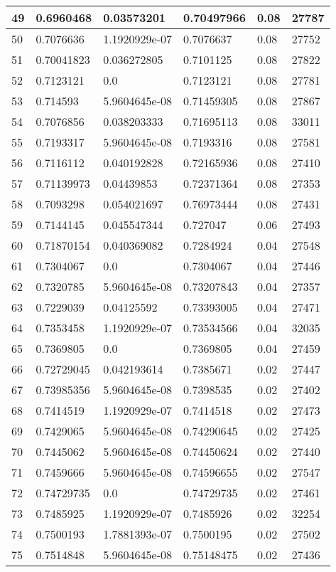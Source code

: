 \begin{longtable}{|l|l|l|l|l|l|}
49 & 0.6960468 & 0.03573201 & 0.70497966 & 0.08 & 27787 \\ \hline 
50 & 0.7076636 & 1.1920929e-07 & 0.7076637 & 0.08 & 27752 \\ \hline 
51 & 0.70041823 & 0.036272805 & 0.7101125 & 0.08 & 27822 \\ \hline 
52 & 0.7123121 & 0.0 & 0.7123121 & 0.08 & 27781 \\ \hline 
53 & 0.714593 & 5.9604645e-08 & 0.71459305 & 0.08 & 27867 \\ \hline 
54 & 0.7076856 & 0.038203333 & 0.71695113 & 0.08 & 33011 \\ \hline 
55 & 0.7193317 & 5.9604645e-08 & 0.7193316 & 0.08 & 27581 \\ \hline 
56 & 0.7116112 & 0.040192828 & 0.72165936 & 0.08 & 27410 \\ \hline 
57 & 0.71139973 & 0.04439853 & 0.72371364 & 0.08 & 27353 \\ \hline 
58 & 0.7093298 & 0.054021697 & 0.76973444 & 0.08 & 27431 \\ \hline 
59 & 0.7144145 & 0.045547344 & 0.727047 & 0.06 & 27493 \\ \hline 
60 & 0.71870154 & 0.040369082 & 0.7284924 & 0.04 & 27548 \\ \hline 
61 & 0.7304067 & 0.0 & 0.7304067 & 0.04 & 27446 \\ \hline 
62 & 0.7320785 & 5.9604645e-08 & 0.73207843 & 0.04 & 27357 \\ \hline 
63 & 0.7229039 & 0.04125592 & 0.73393005 & 0.04 & 27471 \\ \hline 
64 & 0.7353458 & 1.1920929e-07 & 0.73534566 & 0.04 & 32035 \\ \hline 
65 & 0.7369805 & 0.0 & 0.7369805 & 0.04 & 27459 \\ \hline 
66 & 0.72729045 & 0.042193614 & 0.7385671 & 0.02 & 27447 \\ \hline 
67 & 0.73985356 & 5.9604645e-08 & 0.7398535 & 0.02 & 27402 \\ \hline 
68 & 0.7414519 & 1.1920929e-07 & 0.7414518 & 0.02 & 27473 \\ \hline 
69 & 0.7429065 & 5.9604645e-08 & 0.74290645 & 0.02 & 27425 \\ \hline 
70 & 0.7445062 & 5.9604645e-08 & 0.74450624 & 0.02 & 27440 \\ \hline 
71 & 0.7459666 & 5.9604645e-08 & 0.74596655 & 0.02 & 27547 \\ \hline 
72 & 0.74729735 & 0.0 & 0.74729735 & 0.02 & 27461 \\ \hline 
73 & 0.7485925 & 1.1920929e-07 & 0.7485926 & 0.02 & 32254 \\ \hline 
74 & 0.7500193 & 1.7881393e-07 & 0.7500195 & 0.02 & 27502 \\ \hline 
75 & 0.7514848 & 5.9604645e-08 & 0.75148475 & 0.02 & 27436 \\ \hline 
\end{longtable}